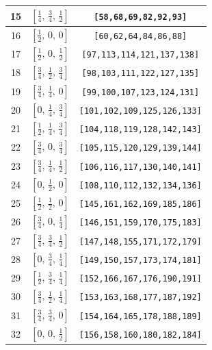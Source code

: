 \documentclass[fleqn,8pt]{jsarticle}
\begin{document}
\begin{longtable}{ccc}
15 & $\left[ \frac{1}{4},\, \frac{3}{4},\, \frac{1}{2} \right]$ & {\tt [58,68,69,82,92,93]} \\ \hline
16 & $\left[ \frac{1}{2},\, 0,\, 0 \right]$ & {\tt [60,62,64,84,86,88]} \\ \hline
17 & $\left[ \frac{1}{2},\, 0,\, \frac{1}{2} \right]$ & {\tt [97,113,114,121,137,138]} \\ \hline
18 & $\left[ \frac{3}{4},\, \frac{1}{2},\, \frac{3}{4} \right]$ & {\tt [98,103,111,122,127,135]} \\ \hline
19 & $\left[ \frac{3}{4},\, \frac{1}{4},\, 0 \right]$ & {\tt [99,100,107,123,124,131]} \\ \hline
20 & $\left[ 0,\, \frac{1}{4},\, \frac{3}{4} \right]$ & {\tt [101,102,109,125,126,133]} \\ \hline
21 & $\left[ \frac{1}{2},\, \frac{1}{4},\, \frac{3}{4} \right]$ & {\tt [104,118,119,128,142,143]} \\ \hline
22 & $\left[ \frac{3}{4},\, 0,\, \frac{3}{4} \right]$ & {\tt [105,115,120,129,139,144]} \\ \hline
23 & $\left[ \frac{3}{4},\, \frac{1}{4},\, \frac{1}{2} \right]$ & {\tt [106,116,117,130,140,141]} \\ \hline
24 & $\left[ 0,\, \frac{1}{2},\, 0 \right]$ & {\tt [108,110,112,132,134,136]} \\ \hline
25 & $\left[ \frac{1}{2},\, \frac{1}{2},\, 0 \right]$ & {\tt [145,161,162,169,185,186]} \\ \hline
26 & $\left[ \frac{3}{4},\, 0,\, \frac{1}{4} \right]$ & {\tt [146,151,159,170,175,183]} \\ \hline
27 & $\left[ \frac{3}{4},\, \frac{3}{4},\, \frac{1}{2} \right]$ & {\tt [147,148,155,171,172,179]} \\ \hline
28 & $\left[ 0,\, \frac{3}{4},\, \frac{1}{4} \right]$ & {\tt [149,150,157,173,174,181]} \\ \hline
29 & $\left[ \frac{1}{2},\, \frac{3}{4},\, \frac{1}{4} \right]$ & {\tt [152,166,167,176,190,191]} \\ \hline
30 & $\left[ \frac{3}{4},\, \frac{1}{2},\, \frac{1}{4} \right]$ & {\tt [153,163,168,177,187,192]} \\ \hline
31 & $\left[ \frac{3}{4},\, \frac{3}{4},\, 0 \right]$ & {\tt [154,164,165,178,188,189]} \\ \hline
32 & $\left[ 0,\, 0,\, \frac{1}{2} \right]$ & {\tt [156,158,160,180,182,184]} \\
\end{longtable}
\renewcommand{\arraystretch}{1.2}
\end{document}
